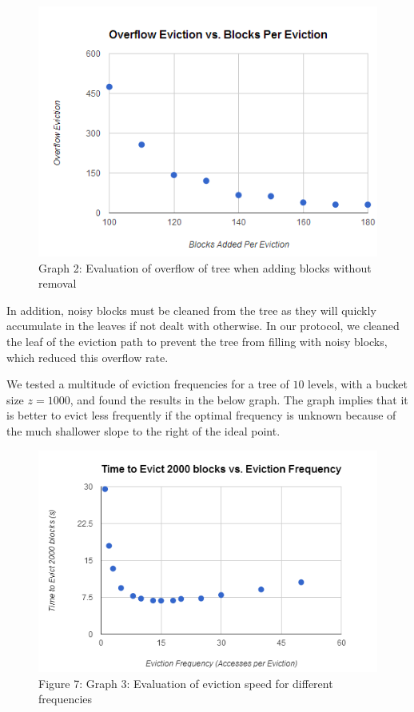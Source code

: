 \documentclass[12pt, oneside]{article}   	%
\begin{document}
\begin{figure}[h!]
  \includegraphics[width=\linewidth]{overflowgraph}
  \caption{Graph 2: Evaluation of overflow of tree when adding blocks without removal}
  \label{fig:overflowgraph}
\end{figure}

In addition, noisy blocks must be cleaned from the tree as they will quickly accumulate in the leaves if not dealt with otherwise. In our protocol, we cleaned the leaf of the eviction path to prevent the tree from filling with noisy blocks, which reduced this overflow rate.

We tested a multitude of eviction frequencies for a tree of $10$ levels, with a bucket size $z = 1000$, and found the results in the below graph. The graph implies that it is better to evict less frequently if the optimal frequency is unknown because of the much shallower slope to the right of the ideal point.

\begin{figure}[h!]
  \includegraphics[width=\linewidth]{evictionfreqgraph}
  \caption{Figure 7: Graph 3: Evaluation of eviction speed for different frequencies}
  \label{fig:evictionfreqgraph}
\end{figure}
\end{document}
